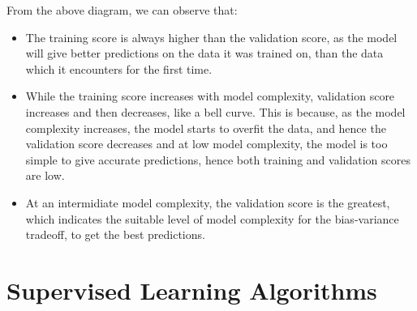 \documentclass[12pt]{article}
\begin{document}
From the above diagram, we can observe that:
\begin{itemize}
    \item The training score is always higher than the validation score, as the model will give better predictions on the data it was trained on, than the data which it encounters for the first time.
    \item While the training score increases with model complexity, validation score increases and then decreases, like a bell curve. This is because, as the model complexity increases, the model starts to overfit the data, and hence the validation score decreases and at low model complexity, the model is too simple to give accurate predictions, hence both training and validation scores are low.
    \item At an intermidiate model complexity, the validation score is the greatest, which indicates the suitable level of model complexity for the bias-variance tradeoff, to get the best predictions.
\end{itemize}



\newpage
\section{Supervised Learning Algorithms}
\end{document}
